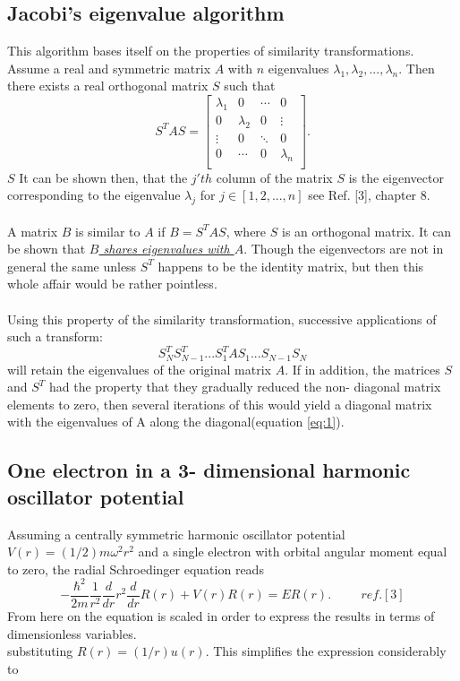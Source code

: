 \documentclass[10pt,a4paper]{article}
\begin{document}
\subsection{Jacobi's eigenvalue algorithm}\label{jacobi algo}
This algorithm bases itself on the properties of similarity transformations. Assume a real and symmetric matrix $A$ with $n$ eigenvalues $\lambda_1,\lambda_2,...,\lambda_n$. Then there exists a real orthogonal matrix $S$ such that
\begin{equation}\label{eq:1}
S^TAS=\begin{bmatrix}
\lambda_1 & 0 & \cdots & 0 \\
0 & \lambda_2 & 0 & \vdots \\
\vdots & 0 & \ddots & 0 \\
0 & \cdots & 0 & \lambda_n \\
\end{bmatrix}.
\end{equation}
$S$ It can be shown then, that the $j'th$ column of the matrix $S$ is the eigenvector corresponding to the eigenvalue $\lambda_j$ for $j \in [1,2,...,n]$ see Ref. [3], chapter 8.\\\\A matrix $B$ is similar to $A$ if $B=S^TAS$, where $S$ is an orthogonal matrix. It can be shown that \hyperref[proof of same eigenvalues]{\emph{$B$ shares eigenvalues with $A$}}. Though the eigenvectors are not in general the same unless $S^T$ happens to be the identity matrix, but then this whole affair would be rather pointless.\\\\Using this property of the similarity transformation, successive applications of such a transform:
$$
S_N^TS_{N-1}^T...S_1^TAS_1...S_{N-1}S_N
$$
will retain the eigenvalues of the original matrix $A$. If in addition, the matrices $S$ and $S^T$ had the property that they gradually reduced the non- diagonal matrix elements to zero, then several iterations of this would yield a diagonal matrix with the eigenvalues of A along the diagonal(equation \ref{eq:1}).
\subsection{One electron in a 3- dimensional harmonic oscillator potential}
Assuming a centrally symmetric harmonic oscillator potential $V(r) = (1/2)m\omega^2r^2$ and a single electron with orbital angular moment equal to zero, the radial Schroedinger equation reads
\begin{equation*}
-\frac{\hbar^2}{2 m} \frac{1}{r^2} \frac{d}{dr} r^2\frac{d}{dr}R(r)+ V(r) R(r) = E R(r). \hspace{1cm} ref.[3]
\end{equation*}
From here on the equation is scaled in order to express the results in terms of dimensionless variables.\\
substituting $R(r) = (1/r) u(r)$. This simplifies the expression considerably to
\end{document}
